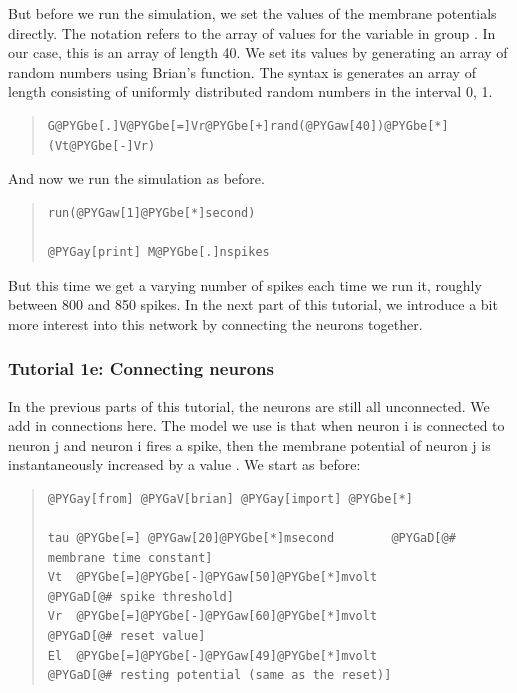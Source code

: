 \documentclass[letterpaper,10pt,english]{manual}
\begin{document}
But before we run the simulation, we set the values of the
membrane potentials directly. The notation  refers
to the array of values for the variable  in group . In
our case, this is an array of length 40. We set its values
by generating an array of random numbers using Brian's
 function. The syntax is  generates an
array of length  consisting of uniformly distributed
random numbers in the interval 0, 1.
\begin{quote}

\begin{Verbatim}[commandchars=@\[\]]
G@PYGbe[.]V@PYGbe[=]Vr@PYGbe[+]rand(@PYGaw[40])@PYGbe[*](Vt@PYGbe[-]Vr)
\end{Verbatim}
\end{quote}

And now we run the simulation as before.
\begin{quote}

\begin{Verbatim}[commandchars=@\[\]]
run(@PYGaw[1]@PYGbe[*]second)

@PYGay[print] M@PYGbe[.]nspikes
\end{Verbatim}
\end{quote}

But this time we get a varying number of spikes each time
we run it, roughly between 800 and 850 spikes. In the
next part of this tutorial, we introduce a bit more
interest into this network by connecting the neurons together.

\resetcurrentobjects


\subsubsection{Tutorial 1e: Connecting neurons}

In the previous parts of this tutorial, the neurons are
still all unconnected. We add in connections here. The
model we use is that when neuron i is connected to
neuron j and neuron i fires a spike, then the membrane
potential of neuron j is instantaneously increased by
a value . We start as before:
\begin{quote}

\begin{Verbatim}[commandchars=@\[\]]
@PYGay[from] @PYGaV[brian] @PYGay[import] @PYGbe[*]

tau @PYGbe[=] @PYGaw[20]@PYGbe[*]msecond        @PYGaD[@# membrane time constant]
Vt  @PYGbe[=]@PYGbe[-]@PYGaw[50]@PYGbe[*]mvolt          @PYGaD[@# spike threshold]
Vr  @PYGbe[=]@PYGbe[-]@PYGaw[60]@PYGbe[*]mvolt          @PYGaD[@# reset value]
El  @PYGbe[=]@PYGbe[-]@PYGaw[49]@PYGbe[*]mvolt          @PYGaD[@# resting potential (same as the reset)]
\end{Verbatim}
\end{quote}
\end{document}
